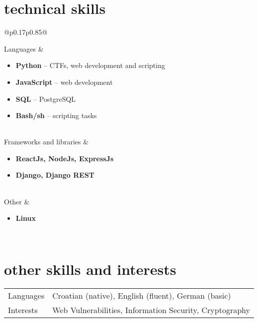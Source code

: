 \documentclass[a4paper]{article}
\makeatletter
\newlength{\tablewidth}
\newenvironment{skills}{%
\setlength{\tablewidth}{\linewidth}
\addtolength{\tablewidth}{-2\tabcolsep}
\begin{tabular}{@{}p{0.17\tablewidth}p{0.85\tablewidth}@{}}
}{%
\end{tabular}
}
\makeatother
\begin{document}
\section{technical skills}
\begin{skills}
    Languages &
    \begin{itemize}
        \item \textbf{Python} --  CTFs, web development and scripting
        \item \textbf{JavaScript} --  web development
        \item \textbf{SQL} --  PostgreSQL
        \item \textbf{Bash/sh} --  scripting tasks 

    \end{itemize} \\
        Frameworks and libraries &
    \begin{itemize}
        
        \item \textbf{ReactJs, NodeJs, ExpressJs} 
        \item \textbf{Django, Django REST}

    \end{itemize} \\
    
        Other &
    \begin{itemize}
        
        \item \textbf{Linux}

    \end{itemize} \\


\end{skills}

\section{other skills and interests}
\begin{skills}
    Languages & Croatian (native), English (fluent), German (basic) \\
    Interests & Web Vulnerabilities, Information Security, Cryptography \\
\end{skills}
\end{document}

